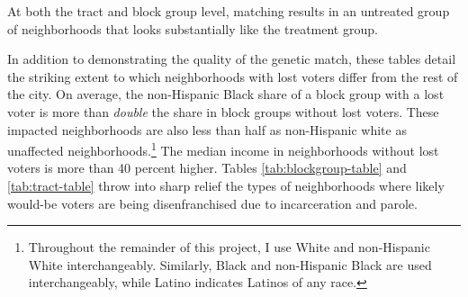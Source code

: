 \documentclass[
  12pt,
]{article}
\begin{document}
\begin{table}[H]

\caption{\label{tab:tract-table-chunk}\label{tab:tract-table} Results of Tract-Level Matching}
\centering
{}
\end{table}

At both the tract and block group level, matching results in an untreated group of neighborhoods that looks substantially like the treatment group.

In addition to demonstrating the quality of the genetic match, these tables detail the striking extent to which neighborhoods with lost voters differ from the rest of the city. On average, the non-Hispanic Black share of a block group with a lost voter is more than \emph{double} the share in block groups without lost voters. These impacted neighborhoods are also less than half as non-Hispanic white as unaffected neighborhoods.\footnote{Throughout the remainder of this project, I use White and non-Hispanic White interchangeably. Similarly, Black and non-Hispanic Black are used interchangeably, while Latino indicates Latinos of any race.} The median income in neighborhoods without lost voters is more than 40 percent higher. Tables \ref{tab:blockgroup-table} and \ref{tab:tract-table} throw into sharp relief the types of neighborhoods where likely would-be voters are being disenfranchised due to incarceration and parole.
\end{document}
